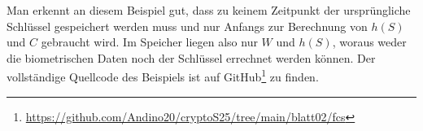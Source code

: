 \documentclass{article}
\begin{document}
    Man erkennt an diesem Beispiel gut, dass zu keinem Zeitpunkt der ursprüngliche Schlüssel gespeichert werden muss und nur 
    Anfangs zur Berechnung von $h(S)$ und $C$ gebraucht wird. Im Speicher liegen also nur $W$ und $h(S)$, woraus weder
    die biometrischen Daten noch der Schlüssel errechnet werden können. Der vollständige Quellcode des Beispiels
    ist auf GitHub\footnote{\href{https://github.com/Andino20/cryptoS25/tree/main/blatt02/fcs}{https://github.com/Andino20/cryptoS25/tree/main/blatt02/fcs}} zu finden.
    \newpage
    
    
\end{document}
